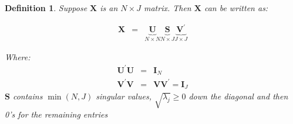 \documentclass{beamer}
\newtheorem{defn}{Definition}
\numberwithin{equation}{section}
\begin{document}
\begin{frame}
\begin{defn}
Suppose $\boldsymbol{X}$ is an $N \times J$ matrix.  Then $\boldsymbol{X}$ can be written as:

\begin{eqnarray}
\boldsymbol{X} & =& \underbrace{\boldsymbol{U}}_{N \times N} \underbrace{\boldsymbol{S}}_{N \times J} \underbrace{\boldsymbol{V}^{'}}_{J \times J} \nonumber
\end{eqnarray}

Where:
\begin{eqnarray}
\boldsymbol{U}^{'}\boldsymbol{U} & = & \boldsymbol{I}_{N} \nonumber \\
\boldsymbol{V}^{'}\boldsymbol{V} & = & \boldsymbol{V}\boldsymbol{V}^{'} = \boldsymbol{I}_{J} \nonumber
\end{eqnarray}
$\boldsymbol{S}$ contains $\min(N, J)$ singular values, $\sqrt{\lambda_{j}}\geq 0$ down the diagonal and then 0's for the remaining entries
\end{defn}


\end{frame}
\end{document}
